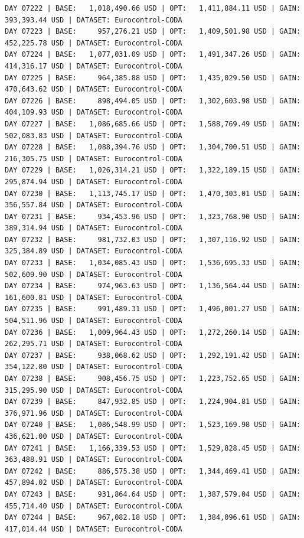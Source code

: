 \documentclass[11pt,a4paper]{article}
\begin{document}
\begin{verbatim}
DAY 07222 | BASE:   1,018,490.66 USD | OPT:   1,411,884.11 USD | GAIN: 393,393.44 USD | DATASET: Eurocontrol-CODA
DAY 07223 | BASE:     957,276.21 USD | OPT:   1,409,501.98 USD | GAIN: 452,225.78 USD | DATASET: Eurocontrol-CODA
DAY 07224 | BASE:   1,077,031.09 USD | OPT:   1,491,347.26 USD | GAIN: 414,316.17 USD | DATASET: Eurocontrol-CODA
DAY 07225 | BASE:     964,385.88 USD | OPT:   1,435,029.50 USD | GAIN: 470,643.62 USD | DATASET: Eurocontrol-CODA
DAY 07226 | BASE:     898,494.05 USD | OPT:   1,302,603.98 USD | GAIN: 404,109.93 USD | DATASET: Eurocontrol-CODA
DAY 07227 | BASE:   1,086,685.66 USD | OPT:   1,588,769.49 USD | GAIN: 502,083.83 USD | DATASET: Eurocontrol-CODA
DAY 07228 | BASE:   1,088,394.76 USD | OPT:   1,304,700.51 USD | GAIN: 216,305.75 USD | DATASET: Eurocontrol-CODA
DAY 07229 | BASE:   1,026,314.21 USD | OPT:   1,322,189.15 USD | GAIN: 295,874.94 USD | DATASET: Eurocontrol-CODA
DAY 07230 | BASE:   1,113,745.17 USD | OPT:   1,470,303.01 USD | GAIN: 356,557.84 USD | DATASET: Eurocontrol-CODA
DAY 07231 | BASE:     934,453.96 USD | OPT:   1,323,768.90 USD | GAIN: 389,314.94 USD | DATASET: Eurocontrol-CODA
DAY 07232 | BASE:     981,732.03 USD | OPT:   1,307,116.92 USD | GAIN: 325,384.89 USD | DATASET: Eurocontrol-CODA
DAY 07233 | BASE:   1,034,085.43 USD | OPT:   1,536,695.33 USD | GAIN: 502,609.90 USD | DATASET: Eurocontrol-CODA
DAY 07234 | BASE:     974,963.63 USD | OPT:   1,136,564.44 USD | GAIN: 161,600.81 USD | DATASET: Eurocontrol-CODA
DAY 07235 | BASE:     991,489.31 USD | OPT:   1,496,001.27 USD | GAIN: 504,511.96 USD | DATASET: Eurocontrol-CODA
DAY 07236 | BASE:   1,009,964.43 USD | OPT:   1,272,260.14 USD | GAIN: 262,295.71 USD | DATASET: Eurocontrol-CODA
DAY 07237 | BASE:     938,068.62 USD | OPT:   1,292,191.42 USD | GAIN: 354,122.80 USD | DATASET: Eurocontrol-CODA
DAY 07238 | BASE:     908,456.75 USD | OPT:   1,223,752.65 USD | GAIN: 315,295.90 USD | DATASET: Eurocontrol-CODA
DAY 07239 | BASE:     847,932.85 USD | OPT:   1,224,904.81 USD | GAIN: 376,971.96 USD | DATASET: Eurocontrol-CODA
DAY 07240 | BASE:   1,086,548.99 USD | OPT:   1,523,169.98 USD | GAIN: 436,621.00 USD | DATASET: Eurocontrol-CODA
DAY 07241 | BASE:   1,166,339.53 USD | OPT:   1,529,828.45 USD | GAIN: 363,488.91 USD | DATASET: Eurocontrol-CODA
DAY 07242 | BASE:     886,575.38 USD | OPT:   1,344,469.41 USD | GAIN: 457,894.02 USD | DATASET: Eurocontrol-CODA
DAY 07243 | BASE:     931,864.64 USD | OPT:   1,387,579.04 USD | GAIN: 455,714.40 USD | DATASET: Eurocontrol-CODA
DAY 07244 | BASE:     967,082.18 USD | OPT:   1,384,096.61 USD | GAIN: 417,014.44 USD | DATASET: Eurocontrol-CODA

\end{verbatim}
\end{document}
